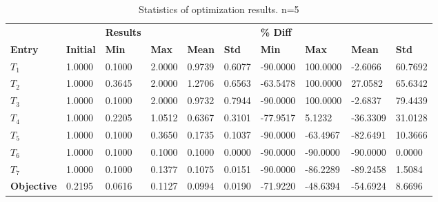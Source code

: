 \begin{table}[H]
\centering
\begin{tabular}{llllllllll}
\textbf{} & \textbf{} & \cellcolor[HTML]{EFEFEF}\textbf{Results} & \cellcolor[HTML]{EFEFEF} & \cellcolor[HTML]{EFEFEF} & \cellcolor[HTML]{EFEFEF} & \cellcolor[HTML]{EFEFEF}\textbf{\% Diff} & \cellcolor[HTML]{EFEFEF} & \cellcolor[HTML]{EFEFEF} & \cellcolor[HTML]{EFEFEF} \\
\rowcolor[HTML]{EFEFEF} 
\textbf{Entry} & \textbf{Initial} & \textbf{Min} & \textbf{Max} & \textbf{Mean} & \textbf{Std} & \textbf{Min} & \textbf{Max} & \textbf{Mean} & \textbf{Std} \\
$T_1$ & 1.0000 & 0.1000 & 2.0000 & 0.9739 & 0.6077 & -90.0000 & 100.0000 & -2.6066 & 60.7692 \\ 
$T_2$ & 1.0000 & 0.3645 & 2.0000 & 1.2706 & 0.6563 & -63.5478 & 100.0000 & 27.0582 & 65.6342 \\ 
$T_3$ & 1.0000 & 0.1000 & 2.0000 & 0.9732 & 0.7944 & -90.0000 & 100.0000 & -2.6837 & 79.4439 \\ 
$T_4$ & 1.0000 & 0.2205 & 1.0512 & 0.6367 & 0.3101 & -77.9517 & 5.1232 & -36.3309 & 31.0128 \\ 
$T_5$ & 1.0000 & 0.1000 & 0.3650 & 0.1735 & 0.1037 & -90.0000 & -63.4967 & -82.6491 & 10.3666 \\ 
$T_6$ & 1.0000 & 0.1000 & 0.1000 & 0.1000 & 0.0000 & -90.0000 & -90.0000 & -90.0000 & 0.0000 \\ 
$T_7$ & 1.0000 & 0.1000 & 0.1377 & 0.1075 & 0.0151 & -90.0000 & -86.2289 & -89.2458 & 1.5084 \\ 
\rowcolor[HTML]{EFEFEF} 
\textbf{Objective} & 0.2195 & 0.0616 & 0.1127 & 0.0994 & 0.0190 & -71.9220 & -48.6394 & -54.6924 & 8.6696 \\ 
\end{tabular}
\caption{Statistics of optimization results. n=5}
\label{tab:StatisticsOptimizationAnalysis}
\end{table}